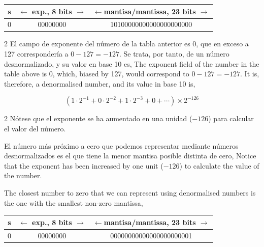 \begin{center}
\begin{tabular}{|c||c||c|}
\hline
s&$\leftarrow$ exp., 8 bits $\rightarrow$&$\leftarrow$mantisa/mantissa, 23 bits $\rightarrow$\\
\hline
0&00000000&10100000000000000000000\\
\hline
\end{tabular}
\end{center}

\begin{paracol}{2}
El campo de exponente del número de la tabla anterior es 0, que en exceso a 127 correspondería a $0-127=-127$. Se trata, por tanto, de un número desnormalizado, y su valor en base 10 es,
\switchcolumn
The exponent field of the number in the table above is 0, which, biased by 127, would correspond to $0-127 = -127$. It is, therefore, a denormalised number, and its value in base 10 is,
\end{paracol}
\begin{equation*}
(1\cdot 2^{-1}+ 0\cdot 2^{-2}+1\cdot2^{-3}+0+\cdots)\times2^{-126}
\end{equation*}
\begin{paracol}{2}
Nótese que el exponente se ha aumentado en una unidad ($-126$) para calcular el valor del número.

 El número más próximo a cero que podemos representar mediante números desnormalizados es el que tiene la menor mantisa posible distinta de cero,
\switchcolumn
Notice that the exponent has been increased by one unit ($-126$) to calculate the value of the number.

 The closest number to zero that we can represent using denormalised numbers is the one with the smallest non-zero mantissa,
\end{paracol}

\begin{center}
\begin{tabular}{|c||c||c|}
\hline
s&$\leftarrow$ exp., 8 bits $\rightarrow$&$\leftarrow$mantisa/mantissa, 23 bits $\rightarrow$\\
\hline
0&00000000&00000000000000000000001\\
\hline
\end{tabular}
\end{center}

